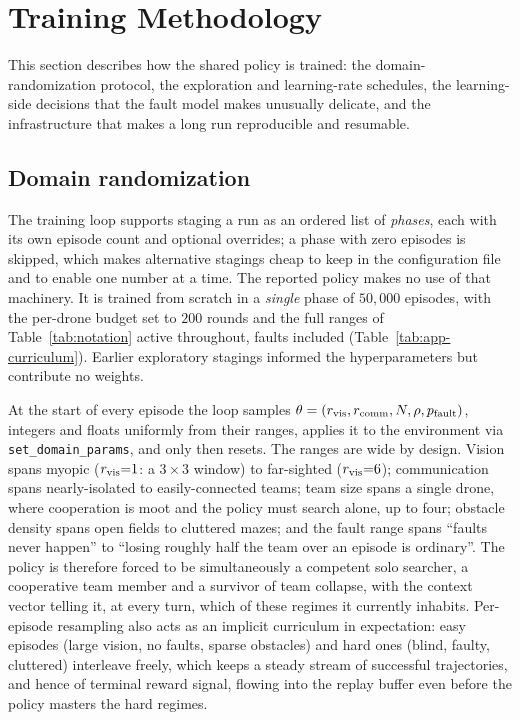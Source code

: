 \section{Training Methodology}
\label{sec:training}

This section describes how the shared policy is trained: the domain-randomization
protocol, the exploration and learning-rate schedules, the learning-side
decisions that the fault model makes unusually delicate, and the infrastructure
that makes a long run reproducible and resumable.

\subsection{Domain randomization}
\label{subsec:train-curriculum}
\label{subsec:train-dr}

The training loop supports staging a run as an ordered list of \emph{phases},
each with its own episode count and optional overrides; a phase with zero
episodes is skipped, which makes alternative stagings cheap to keep in the
configuration file and to enable one number at a time. The reported policy makes
no use of that machinery. It is trained from scratch in a \emph{single} phase of
$50{,}000$ episodes, with the per-drone budget set to $200$ rounds and the full
ranges of Table~\ref{tab:notation} active throughout, faults included
(Table~\ref{tab:app-curriculum}). Earlier exploratory stagings informed the
hyperparameters but contribute no weights.

At the start of every episode the loop samples
$\theta = (r_{\mathrm{vis}}, r_{\mathrm{comm}}, N, \rho, p_{\mathrm{fault}})$, integers and floats
uniformly from their ranges, applies it to the environment via
\texttt{set\_domain\_params}, and only then resets. The ranges are wide by
design. Vision spans myopic ($r_{\mathrm{vis}}{=}1$: a $3\times3$ window) to far-sighted
($r_{\mathrm{vis}}{=}6$); communication spans nearly-isolated to easily-connected teams;
team size spans a single drone, where cooperation is moot and the policy must
search alone, up to four; obstacle density spans open fields to cluttered mazes;
and the fault range spans ``faults never happen'' to ``losing roughly half the
team over an episode is ordinary''. The policy is therefore forced to be
simultaneously a competent solo searcher, a cooperative team member and a
survivor of team collapse, with the context vector telling it, at every turn,
which of these regimes it currently inhabits. Per-episode resampling also acts as
an implicit curriculum in expectation: easy episodes (large vision, no faults,
sparse obstacles) and hard ones (blind, faulty, cluttered) interleave freely,
which keeps a steady stream of successful trajectories, and hence of terminal
reward signal, flowing into the replay buffer even before the policy masters the
hard regimes.

